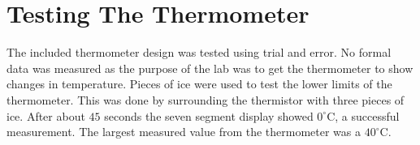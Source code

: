 \documentclass[main.tex]{subfiles}
\begin{document}
\chapter{Testing The Thermometer}

The included thermometer design was tested using trial and error. No formal data
was measured as the purpose of the lab was to get the thermometer to show
changes in temperature. Pieces of ice were used to test the lower limits of the
thermometer. This was done by surrounding the thermistor with three pieces of
ice. After about $45$ seconds the seven segment display showed
$0^{\circ}\mathrm{C}$, a successful measurement. The largest measured value from
the thermometer was a $40^{\circ}\mathrm{C}$.
\end{document}
